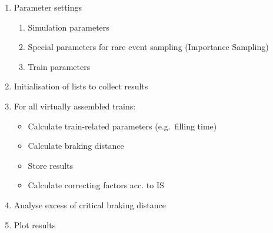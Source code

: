 \documentclass[11pt,a4paper, d]{scrartcl}
\providecommand{\tightlist}{%
      \setlength{\itemsep}{0pt}\setlength{\parskip}{0pt}}
\begin{document}
\begin{enumerate}
\def\labelenumi{\arabic{enumi}.}
\tightlist
\item
  Parameter settings

  \begin{enumerate}
  \def\labelenumii{\arabic{enumii}.}
  \tightlist
  \item
    Simulation parameters
  \item
    Special parameters for rare event sampling (Importance Sampling)
  \item
    Train parameters
  \end{enumerate}
\item
  Initialisation of lists to collect results
\item
  For all virtually assembled trains:

  \begin{itemize}
  \tightlist
  \item
    Calculate train-related parameters (e.g.~filling time)
  \item
    Calculate braking distance
  \item
    Store results
  \item
    Calculate correcting factors acc. to IS
  \end{itemize}
\item
  Analyse excess of critical braking distance
\item
  Plot results
\end{enumerate}
\end{document}
